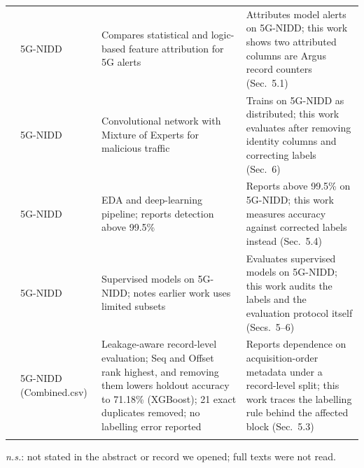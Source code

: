 \begin{table}[t]
\begin{tabularx}{\textwidth}{p{1.85cm} p{1.85cm} X X p{2.25cm} p{1.85cm} X}
\addlinespace[2pt]
\citep{uccello2026_featureattr} & 5G-NIDD & \multicolumn{3}{p{0.40\textwidth}}{Compares statistical and logic-based feature attribution for 5G alerts} & \multicolumn{2}{p{0.26\textwidth}}{Attributes model alerts on 5G-NIDD; this work shows two attributed columns are Argus record counters (Sec.~5.1)}\\
\addlinespace[2pt]
\citep{ilias2024_cnnmoe} & 5G-NIDD & \multicolumn{3}{p{0.40\textwidth}}{Convolutional network with Mixture of Experts for malicious traffic} & \multicolumn{2}{p{0.26\textwidth}}{Trains on 5G-NIDD as distributed; this work evaluates after removing identity columns and correcting labels (Sec.~6)}\\
\addlinespace[2pt]
\citep{moubayed2024_eda_pipeline} & 5G-NIDD & \multicolumn{3}{p{0.40\textwidth}}{EDA and deep-learning pipeline; reports detection above 99.5\%} & \multicolumn{2}{p{0.26\textwidth}}{Reports above 99.5\% on 5G-NIDD; this work measures accuracy against corrected labels instead (Sec.~5.4)}\\
\addlinespace[2pt]
\citep{lassoued2026_supervised_5gnidd} & 5G-NIDD & \multicolumn{3}{p{0.40\textwidth}}{Supervised models on 5G-NIDD; notes earlier work uses limited subsets} & \multicolumn{2}{p{0.26\textwidth}}{Evaluates supervised models on 5G-NIDD; this work audits the labels and the evaluation protocol itself (Secs.~5--6)}\\
\addlinespace[2pt]
\citep{abraheem2026_seqmeta} & 5G-NIDD (Combined.csv) & \multicolumn{3}{p{0.40\textwidth}}{Leakage-aware record-level evaluation; Seq and Offset rank highest, and removing them lowers holdout accuracy to 71.18\% (XGBoost); 21 exact duplicates removed; no labelling error reported} & \multicolumn{2}{p{0.26\textwidth}}{Reports dependence on acquisition-order metadata under a record-level split; this work traces the labelling rule behind the affected block (Sec.~5.3)}\\
\addlinespace[2pt]
\bottomrule
\end{tabularx}
\vspace{2pt}
{\footnotesize \textit{n.s.}: not stated in the abstract or record we
opened; full texts were not read.}
\end{table}
